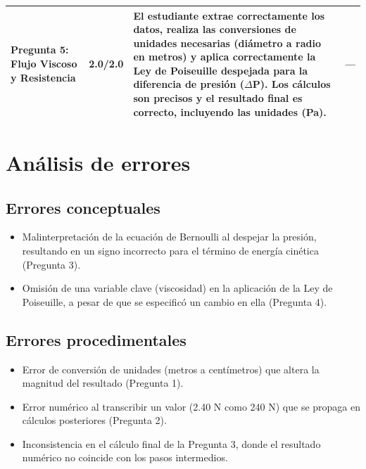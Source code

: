 \documentclass[11pt,a4paper]{article}
\begin{document}
\begin{longtable}{>{\bfseries}p{2.8cm} p{1.6cm} p{7.0cm} p{2.8cm}}
    \midrule
    \textbf{Pregunta 5: Flujo Viscoso y Resistencia} & 2.0/2.0 & El estudiante extrae correctamente los datos, realiza las conversiones de unidades necesarias (diámetro a radio en metros) y aplica correctamente la Ley de Poiseuille despejada para la diferencia de presión ($\Delta$P). Los cálculos son precisos y el resultado final es correcto, incluyendo las unidades (Pa). & \textit{---} \\
    \midrule
\end{longtable}

\section*{Análisis de errores}

\subsection*{Errores conceptuales}
\begin{itemize}[leftmargin=1.5em, itemsep=2pt]
  \item Malinterpretación de la ecuación de Bernoulli al despejar la presión, resultando en un signo incorrecto para el término de energía cinética (Pregunta 3).
  \item Omisión de una variable clave (viscosidad) en la aplicación de la Ley de Poiseuille, a pesar de que se especificó un cambio en ella (Pregunta 4).
\end{itemize}

\subsection*{Errores procedimentales}
\begin{itemize}[leftmargin=1.5em, itemsep=2pt]
  \item Error de conversión de unidades (metros a centímetros) que altera la magnitud del resultado (Pregunta 1).
  \item Error numérico al transcribir un valor (2.40 N como 240 N) que se propaga en cálculos posteriores (Pregunta 2).
  \item Inconsistencia en el cálculo final de la Pregunta 3, donde el resultado numérico no coincide con los pasos intermedios.
\end{itemize}

\end{document}

